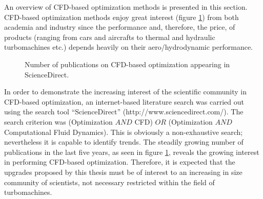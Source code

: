 An overview of CFD-based optimization methods is presented in this section. CFD-based optimization methods enjoy great interest (figure \ref{pubs.CFD}) from both academia and industry since the performance and, therefore, the price, of products (ranging from cars and aircrafts to thermal and hydraulic turbomachines etc.) depends heavily on their aero/hydrodynamic performance. 

\begin{figure}[h!]
\begin{minipage}[b]{1\linewidth}
 \centering
\end{minipage}
\caption{Number of publications on CFD-based optimization appearing in ScienceDirect.} 
\label{pubs.CFD}
\end{figure}

In order to demonstrate the increasing interest of the scientific community in CFD-based optimization, an internet-based literature search was carried out using the search tool ``ScienceDirect'' (http://www.sciencedirect.com/). The search criterion was (Optimization $AND$ CFD) $OR$ (Optimization $AND$ Computational Fluid Dynamics).  This is obviously a non-exhaustive search; nevertheless it is capable to identify trends.  The steadily growing number of publications in the last five years, as seen in figure \ref{pubs.CFD}, reveals the growing interest in performing CFD-based optimization. Therefore, it is expected that the upgrades proposed by this thesis must be of interest to an increasing in size community of scientists, not necessary restricted within the field of turbomachines.     
 
